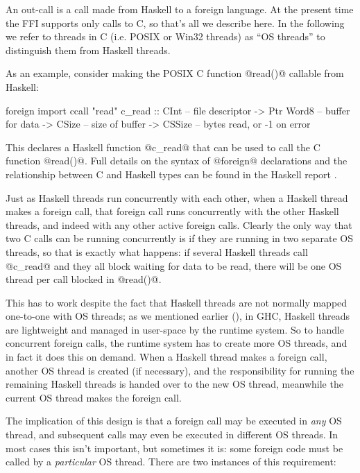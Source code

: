 
An out-call is a call made from Haskell to a foreign language.  At the
present time the FFI supports only calls to C, so that's all we
describe here.  In the following we refer to threads in C (i.e. POSIX
or Win32 threads) as ``OS threads'' to distinguish them from Haskell
threads.

As an example, consider making the POSIX C function @read()@ callable
from Haskell:

\begin{haskell}
foreign import ccall "read"
   c_read :: CInt      -- file descriptor
          -> Ptr Word8 -- buffer for data
          -> CSize     -- size of buffer
          -> CSSize    -- bytes read, or -1 on error
\end{haskell}

\noindent This declares a Haskell function @c_read@ that can be used
to call the C function @read()@.  Full details on the syntax of
@foreign@ declarations and the relationship between C and Haskell
types can be found in the Haskell report \cite{haskell2010}.

Just as Haskell threads run concurrently with each other, when a
Haskell thread makes a foreign call, that foreign call runs
concurrently with the other Haskell threads, and indeed with any other
active foreign calls.  Clearly the only way that two C calls can be
running concurrently is if they are running in two separate OS
threads, so that is exactly what happens: if several Haskell threads
call @c_read@ and they all block waiting for data to be read, there
will be one OS thread per call blocked in @read()@.

This has to work despite the fact that Haskell threads are not
normally mapped one-to-one with OS threads; as we mentioned earlier
(), in GHC, Haskell threads are lightweight and
managed in user-space by the runtime system.  So to handle concurrent
foreign calls, the runtime system has to create more OS threads, and
in fact it does this on demand.  When a Haskell thread makes a foreign
call, another OS thread is created (if necessary), and the
responsibility for running the remaining Haskell threads is handed
over to the new OS thread, meanwhile the current OS thread makes the
foreign call.

The implication of this design is that a foreign call may be executed
in \emph{any} OS thread, and subsequent calls may even be executed in
different OS threads. In most cases this isn't important, but
sometimes it is: some foreign code must be called by a \emph{particular}
OS thread.  There are two instances of this requirement:


